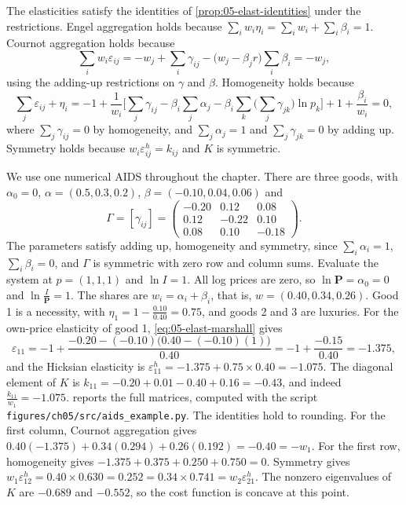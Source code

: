 The elasticities satisfy the identities of \cref{prop:05-elast-identities} under the restrictions. Engel
aggregation holds because $\sum_iw_i\eta_i = \sum_iw_i + \sum_i\beta_i = 1$. Cournot aggregation holds
because
\begin{equation*}
\sum_iw_i\varepsilon_{ij} = -w_j + \sum_i\gamma_{ij} - \big(w_j - \beta_jr\big)\sum_i\beta_i = -w_j ,
\end{equation*}
using the adding-up restrictions on $\gamma$ and $\beta$. Homogeneity holds because
\begin{equation*}
\sum_j\varepsilon_{ij} + \eta_i = -1 + \frac{1}{w_i}\Big[\sum_j\gamma_{ij} - \beta_i\sum_j\alpha_j -
\beta_i\sum_k\Big(\sum_j\gamma_{jk}\Big)\ln p_k\Big] + 1 + \frac{\beta_i}{w_i} = 0 ,
\end{equation*}
where $\sum_j\gamma_{ij} = 0$ by homogeneity, and $\sum_j\alpha_j = 1$ and $\sum_j\gamma_{jk} = 0$ by adding
up. Symmetry holds because $w_i\varepsilon^h_{ij} = k_{ij}$ and $K$ is symmetric.

\begin{example}\label{ex:05-running}
We use one numerical AIDS throughout the chapter. There are three goods, with $\alpha_0 = 0$,
$\alpha = (0.5, 0.3, 0.2)$, $\beta = (-0.10, 0.04, 0.06)$ and
\begin{equation*}
\Gamma = [\gamma_{ij}] = \begin{pmatrix} -0.20 & 0.12 & 0.08\\ 0.12 & -0.22 & 0.10\\ 0.08 & 0.10 & -0.18
\end{pmatrix}.
\end{equation*}
The parameters satisfy adding up, homogeneity and symmetry, since $\sum_i\alpha_i = 1$,
$\sum_i\beta_i = 0$, and $\Gamma$ is symmetric with zero row and column sums. Evaluate the system at
$p = (1, 1, 1)$ and $\ln I = 1$. All log prices are zero, so $\ln\mathbf{P} = \alpha_0 = 0$ and
$\ln\frac{I}{\mathbf{P}} = 1$. The shares are $w_i = \alpha_i + \beta_i$, that is,
$w = (0.40, 0.34, 0.26)$. Good 1 is a necessity, with $\eta_1 = 1 - \frac{0.10}{0.40} = 0.75$, and goods 2
and 3 are luxuries. For the own-price elasticity of good 1, \eqref{eq:05-elast-marshall} gives
\begin{equation*}
\varepsilon_{11} = -1 + \frac{-0.20 - (-0.10)\big(0.40 - (-0.10)(1)\big)}{0.40} = -1 + \frac{-0.15}{0.40}
= -1.375 ,
\end{equation*}
and the Hicksian elasticity is $\varepsilon^h_{11} = -1.375 + 0.75 \times 0.40 = -1.075$. The diagonal
element of $K$ is $k_{11} = -0.20 + 0.01 - 0.40 + 0.16 = -0.43$, and indeed
$\frac{k_{11}}{w_1} = -1.075$.  reports the full matrices, computed with the
script \texttt{figures/ch05/src/aids\_example.py}. The identities hold to rounding. For the first column,
Cournot aggregation gives $0.40(-1.375) + 0.34(0.294) + 0.26(0.192) = -0.40 = -w_1$. For the first row,
homogeneity gives $-1.375 + 0.375 + 0.250 + 0.750 = 0$. Symmetry gives
$w_1\varepsilon^h_{12} = 0.40 \times 0.630 = 0.252 = 0.34 \times 0.741 = w_2\varepsilon^h_{21}$. The nonzero
eigenvalues of $K$ are $-0.689$ and $-0.552$, so the cost function is concave at this point.
\end{example}

